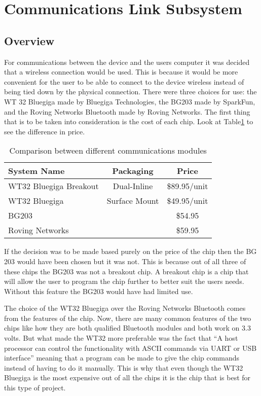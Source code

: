 \section[Wireless Link]{Communications Link Subsystem}
\subsection{Overview}
For communications between the device and the users computer it was decided 
that a wireless connection would be used.  This is because it would be more 
convenient for the user to be able to connect to the device wireless instead of
 being tied down by the physical connection.  There were three choices for use:
 the WT 32 Bluegiga made by Bluegiga Technologies, the BG203 made by SparkFun, 
and the Roving Networks Bluetooth made by Roving Networks.  The first thing 
that is to be taken into consideration is the cost of each chip. Look at 
Table\ref{tab:bt_prices} to see the difference in price.

\begin{table}[hbp]
\caption{Comparison between different communications modules \cite{web:wt32-price}\cite{web:bg203-price}\cite{web:roving-price}}
\begin{tabular}{l | c c } 
	System Name & Packaging & Price \\\hline
	WT32 Bluegiga Breakout & Dual-Inline & \$89.95/unit \\
	WT32 Bluegiga & Surface Mount & \$49.95/unit \\
	BG203 & & \$54.95 \\
	Roving Networks & & \$59.95
\end{tabular}
\label{tab:bt_prices}
\end{table}

If the decision was to be made based purely on the price of the chip then the 
BG 203 would have been chosen but it was not.  This is because out of all three
 of these chips the BG203 was not a breakout chip.  A breakout chip is a chip 
that will allow the user to program the chip further to better suit the users 
needs.  Without this feature the BG203 would have had limited use.

The choice of the WT32 Bluegiga over the Roving Networks Bluetooth comes from 
the features of the chip.  Now, there are many common features of the two chips
 like how they are both qualified Bluetooth modules and both work on 3.3 volts.
  But what made the WT32 more preferable was the fact that ``A host processor 
can control the functionality with ASCII commands via UART or USB 
interface'' meaning that a program can be made to give the chip commands 
instead of having to do it manually\cite{web:wt32-price}.  This is why that 
even though the WT32 Bluegiga is the most expensive out of all the chips it is 
the chip that is best for this type of project. 

